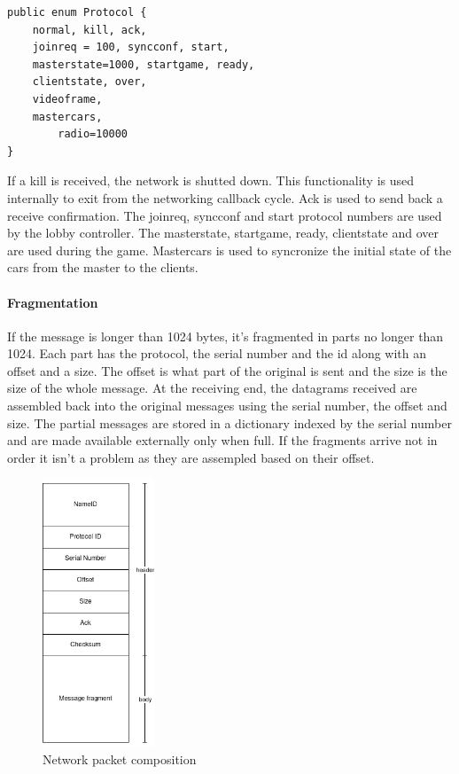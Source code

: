 \documentclass[12pt]{article}
\begin{document}
	\lstset{style=sharpc}
	\begin{lstlisting}
public enum Protocol {
	normal, kill, ack,
	joinreq = 100, syncconf, start, 
	masterstate=1000, startgame, ready, 
	clientstate, over, 
	videoframe, 
	mastercars,
        radio=10000
}
\end{lstlisting}


If a kill is received, the network is shutted down. This functionality is used internally to exit from the networking callback cycle. Ack is used to send back a receive confirmation. The joinreq, syncconf and start protocol numbers are used by the lobby controller. The masterstate, startgame, ready, clientstate and over are used during the game. Mastercars is used to syncronize the initial state of the cars from the master to the clients. \\

\clearpage

\paragraph{Fragmentation}
If the message is longer than 1024 bytes, it's fragmented in parts no longer than 1024. Each part has the protocol, the serial number and the id along with an offset and a size. The offset is what part of the original is sent and the size is the size of the whole message. At the receiving end, the datagrams received are assembled back into the original messages using the serial number, the offset and size. The partial messages are stored in a dictionary indexed by the serial number and are made available externally only when full. If the fragments arrive not in order it isn't a problem as they are assempled based on their offset.

\begin{figure}[H]
\begin{center}
\includegraphics[height=8cm]{packet}
\end{center}
\caption{Network packet composition}
\end{figure}
\end{document}
